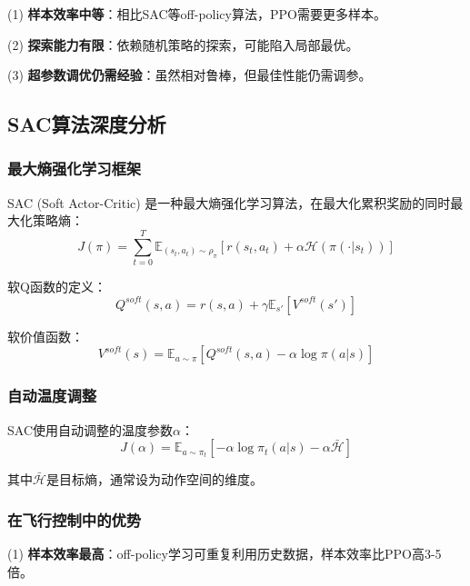 \documentclass[12pt,a4paper]{ctexart}
\begin{document}
(1) \textbf{样本效率中等}：相比SAC等off-policy算法，PPO需要更多样本。

(2) \textbf{探索能力有限}：依赖随机策略的探索，可能陷入局部最优。

(3) \textbf{超参数调优仍需经验}：虽然相对鲁棒，但最佳性能仍需调参。

\subsection{SAC算法深度分析}

\subsubsection{最大熵强化学习框架}

SAC (Soft Actor-Critic) 是一种最大熵强化学习算法，在最大化累积奖励的同时最大化策略熵：
\begin{equation}
J(\pi) = \sum_{t=0}^{T} \mathbb{E}_{(s_t,a_t)\sim\rho_\pi}\left[r(s_t, a_t) + \alpha \mathcal{H}(\pi(\cdot|s_t))\right]
\end{equation}

软Q函数的定义：
\begin{equation}
Q^{soft}(s,a) = r(s,a) + \gamma \mathbb{E}_{s'}\left[V^{soft}(s')\right]
\end{equation}

软价值函数：
\begin{equation}
V^{soft}(s) = \mathbb{E}_{a\sim\pi}\left[Q^{soft}(s,a) - \alpha \log \pi(a|s)\right]
\end{equation}

\subsubsection{自动温度调整}

SAC使用自动调整的温度参数$\alpha$：
\begin{equation}
J(\alpha) = \mathbb{E}_{a\sim\pi_t}\left[-\alpha \log \pi_t(a|s) - \alpha \bar{\mathcal{H}}\right]
\end{equation}

其中$\bar{\mathcal{H}}$是目标熵，通常设为动作空间的维度。

\subsubsection{在飞行控制中的优势}

(1) \textbf{样本效率最高}：off-policy学习可重复利用历史数据，样本效率比PPO高3-5倍。
\end{document}
